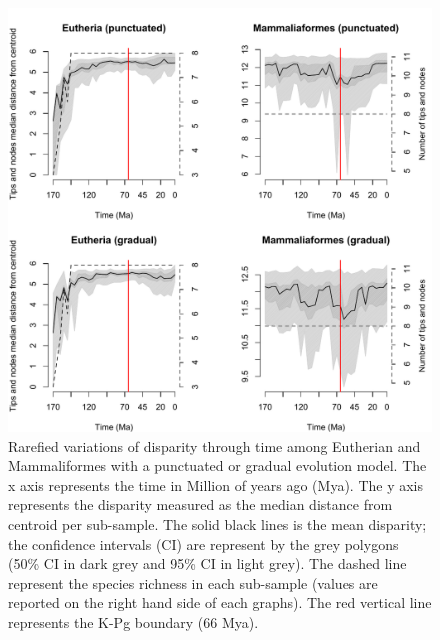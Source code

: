 \documentclass[12pt,letterpaper]{article}
\begin{document}
\begin{figure}[!htbp]
\centering
    \includegraphics[keepaspectratio=true]{Figures/Main_results_rarefied.pdf}
\caption{Rarefied variations of disparity through time among Eutherian and Mammaliformes with a punctuated or gradual evolution model. The x axis represents the time in Million of years ago (Mya). The y axis represents the disparity measured as the median distance from centroid per sub-sample. The solid black lines is the mean disparity; the confidence intervals (CI) are represent by the grey polygons (50\% CI in dark grey and 95\% CI in light grey). The dashed line represent the species richness in each sub-sample (values are reported on the right hand side of each graphs). The red vertical line represents the K-Pg boundary (66 Mya).}
\label{fig:Fig_Rar_results}
\end{figure}
\end{document}
